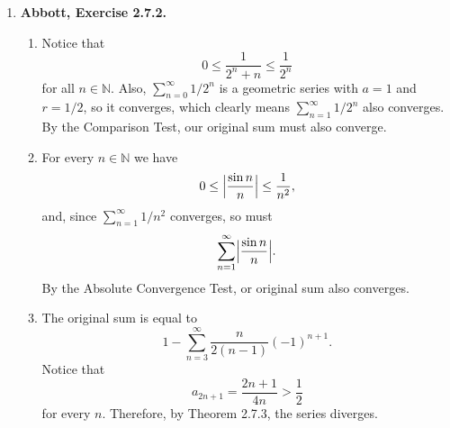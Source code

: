 \documentclass{article}
\DeclarePairedDelimiter\abs{\lvert}{\rvert}
\newcommand{\N}{\mathbb{N}}
\newcommand{\ra}{\rightarrow}
\newcommand{\exc}[2][Abbott]{\item \textbf{#1, Exercise #2.}}
\newcommand{\lep}[1][L]{#1et $\epsilon > 0$ be arbitrary}
\begin{document}
\begin{enumerate}
\begin{enumerate}
        
        \item It is easy to see with induction that $a_1 \geq S_n \geq 0$ for all $n \in \N$. Since $S_{2n}$ is increasing and bounded above by $a_1$, the Monotone Convergence Theorem guarantees its convergence. Also, ${S_{2n-1}}$ is decreasing and bounded below by $0$, so it must also converge. Now, we show that $(S_{2n})$ and $(S_{2n-1})$ are equivalent (Definition \ref{def_equivSequences}). \lep. Choose $N \in N$ such that $\abs{a_n} < \epsilon$ for all $n \geq N$. Then, $\abs{S_{2n}-S_{2n-1}} = \abs{a_{2n}} \leq \abs{a_n} < \epsilon$ for all $n \geq N$, so the sequences are equivalent. By Lemma \ref{lem_equivCauchySequences}, they must converge to the same real number $a$, and we've already shown in Exercise 2.3.5 that this means $(S_n) \ra a$ as well, since $(S_n)$ is the shuffled sequence of $(S_{2n-1})$ and $(S_{2n})$. 
    \end{enumerate}
    
    \exc{2.7.2}
    \begin{enumerate}
        \item Notice that 
        \begin{equation*}
            0 \leq \frac{1}{2^n+n} \leq \frac{1}{2^n}
        \end{equation*} for all $n \in \N$. Also, $\sum_{n=0}^\infty 1/2^n$ is a geometric series with $a = 1$ and $r = 1/2$, so it converges, which clearly means $\sum_{n=1}^\infty 1/2^n$ also converges. By the Comparison Test, our original sum must also converge.
        
        \item For every $n \in \N$ we have 
        \begin{equation*}
            0 \leq \abs[\Big]{\frac{\sin{n}}{n}} \leq \frac{1}{n^2},
        \end{equation*} and, since $\sum_{n=1}^\infty 1/n^2$ converges, so must 
        \begin{equation*}
            \sum_{n=1}^\infty \abs[\Big]{\frac{\sin{n}}{n}}.
        \end{equation*} By the Absolute Convergence Test, or original sum also converges.
        
        \item The original sum is equal to 
        \begin{equation*}
            1 - \sum_{n=3}^\infty \frac{n}{2(n-1)} (-1)^{n+1}.
        \end{equation*} Notice that 
        \begin{equation*}
            a_{2n+1} = \frac{2n+1}{4n} > \frac{1}{2}
        \end{equation*} for every $n$. Therefore, by Theorem 2.7.3, the series diverges.
        

\end{enumerate}
\end{enumerate}
\end{document}
